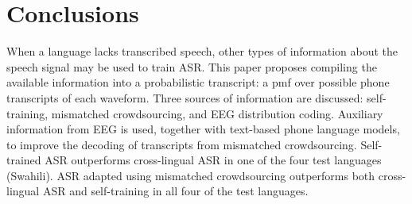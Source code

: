 
\section{Conclusions}

When a language lacks transcribed speech, other types of information
about the speech signal may be used to train ASR.  This paper proposes
compiling the available information into a probabilistic transcript: a
pmf over possible phone transcripts of each waveform.  Three sources
of information are discussed: self-training, mismatched crowdsourcing,
and EEG distribution coding.  Auxiliary information from EEG is used,
together with text-based phone language models, to improve the
decoding of transcripts from mismatched crowdsourcing.  Self-trained
ASR outperforms cross-lingual ASR in one of the four test languages
(Swahili).  ASR adapted using mismatched crowdsourcing outperforms
both cross-lingual ASR and self-training in all four of the test
languages.
